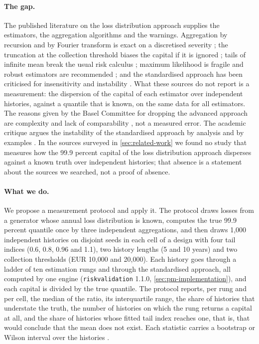 \paragraph{The gap.} The published literature on the loss distribution approach supplies the estimators, the aggregation algorithms and the warnings.
Aggregation by recursion and by Fourier transform is exact on a discretised severity \citep{panjer1981,shevchenko2010}; the truncation at the collection threshold biases the capital if it is
ignored \citep{mignola2007,cope2009}; tails of infinite mean break the usual risk calculus \citep{neslehova2006,chavez2006}; maximum likelihood is fragile and robust estimators are recommended
\citep{opdyke2012}; and the standardised approach has been criticised for insensitivity and instability \citep{peters2016,mignola2016}. What these sources do not report is a measurement:
the dispersion of the capital of each estimator over independent histories, against a quantile that is known, on the same data for all
estimators. The reasons given by the Basel Committee for dropping the advanced approach are complexity and lack of comparability
\citep{bcbsd355}, not a measured error. The academic critique argues the instability of the standardised approach by analysis and by examples
\citep{peters2016}. In the sources surveyed in
\cref{sec:related-work} we found no study that measures how the 99.9 percent capital of the loss distribution approach disperses against a known truth over independent
histories; that absence is a statement about the sources we searched, not a proof of absence.

\paragraph{What we do.} We propose a measurement protocol and apply it. The protocol draws losses from a generator whose annual loss distribution is known, computes the true 99.9 percent
quantile once by three independent aggregations, and then draws 1{,}000 independent histories on disjoint seeds in each cell of a design with four tail indices (0.6, 0.8, 0.96 and 1.1),
two history lengths (5 and 10 years) and two collection thresholds (EUR 10,000 and 20,000). Each history goes through a ladder of ten estimation rungs and through the standardised approach,
all computed by one engine (\texttt{riskvalidation} 1.1.0, \cref{sec:pm-implementation}), and each capital is divided by the true quantile. The protocol reports, per rung and per cell, the median of the ratio, its interquartile range,
the share of histories that understate the truth, the number of histories on which the rung returns a capital at all, and the share of histories whose fitted tail index reaches one,
that is, that would conclude that the mean does not exist. Each statistic carries a bootstrap or Wilson interval over the histories \citep{efron1979,wilson1927}.

